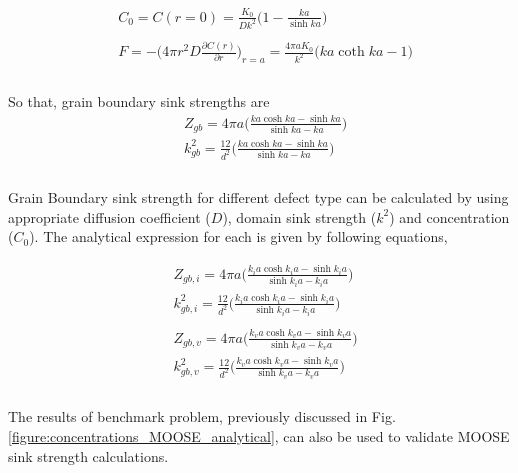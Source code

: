 \documentclass[utf8]{frontiersSCNS} %
\begin{document}
    \begin{equation}
      \begin{aligned}
        &C_0=C(r=0)=\frac{K_0}{Dk^2}\bigg(1-\frac{ka}{\sinh{ka}}\bigg)\\\\
        &F=-\bigg(4\pi r^2D\frac{\partial C(r)}{\partial r}\bigg)_{r=a}=\frac{4\pi aK_0}{k^2}\bigg(ka\coth{ka}-1\bigg)\\
      \end{aligned}
    \end{equation}\\
    So that, grain boundary sink strengths are
    \begin{equation}
      \begin{aligned}
        &Z_{gb}=4\pi a\bigg(\frac{ka\cosh ka-\sinh ka}{\sinh ka-ka}\bigg)\\
        &k^2_{gb}=\frac{12}{d^2}\bigg(\frac{ka\cosh ka-\sinh ka}{\sinh ka-ka}\bigg)\\
      \end{aligned}
    \end{equation}\\

    Grain Boundary sink strength for different defect type can be calculated by using appropriate diffusion coefficient (${D}$), domain sink strength (${k^2}$) and concentration (${C_0}$). The analytical expression for each is given by following equations,

    \begin{equation}
      \begin{aligned}
        &Z_{gb,i}=4\pi a\bigg(\frac{k_ia\cosh k_ia-\sinh k_ia}{\sinh k_ia-k_ia}\bigg)\\
        &k^2_{gb,i}=\frac{12}{d^2}\bigg(\frac{k_ia\cosh k_ia-\sinh k_ia}{\sinh k_ia-k_ia}\bigg)\\\\
        &Z_{gb,v}=4\pi a\bigg(\frac{k_va\cosh k_va-\sinh k_va}{\sinh k_va-k_va}\bigg)\\
        &k^2_{gb,v}=\frac{12}{d^2}\bigg(\frac{k_va\cosh k_va-\sinh k_va}{\sinh k_va-k_va}\bigg)\\
      \end{aligned}
    \end{equation}\\

    The results of benchmark problem, previously discussed in Fig. \ref{figure:concentrations_MOOSE_analytical}, can also be used to validate MOOSE sink strength calculations.
\end{document}
